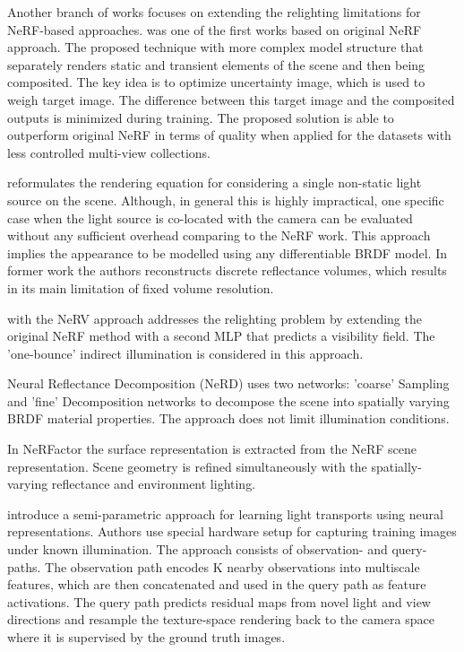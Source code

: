 Another branch of works focuses on extending the relighting limitations for NeRF-based approaches.
\cite{martinbrualla2021nerfw} was one of the first works based on original NeRF approach.
The proposed technique with more complex model structure
that separately renders static and transient elements of the scene
and then being composited.
The key idea is to optimize uncertainty image, which is used to weigh target image.
The difference between this target image and the composited outputs is minimized during training.
The proposed solution is able to outperform original NeRF in terms of quality
when applied for the datasets with less controlled multi-view collections.

\cite{bi2020neural} reformulates the rendering equation for considering a single non-static light source on the scene.
Although, in general this is highly impractical, one specific case
when the light source is co-located with the camera can be evaluated
without any sufficient overhead comparing to the NeRF work.
This approach implies the appearance to be modelled using any differentiable BRDF model.
In former work \cite{bi2020deep} the authors reconstructs discrete reflectance volumes,
which results in its main limitation of fixed volume resolution.

\cite{nerv2021} with the NeRV approach addresses the relighting problem
by extending the original NeRF method with a second MLP
that predicts a visibility field.
The 'one-bounce' indirect illumination is considered in this approach.

Neural Reflectance Decomposition (NeRD) \cite{boss2020nerd} uses two networks:
'coarse' Sampling and 'fine' Decomposition networks to decompose the scene into
spatially varying BRDF material properties.
The approach does not limit illumination conditions.

In NeRFactor \cite{nerfactor} the surface representation is extracted from the NeRF scene representation.
Scene geometry is refined simultaneously with the spatially-varying reflectance and environment lighting.



\cite{Zhang2021lighttransport} introduce a semi-parametric approach
for learning light transports using neural representations.
Authors use special hardware setup for capturing training images under known illumination.
The approach consists of observation- and query-paths.
The observation path encodes K nearby observations into multiscale features,
which are then concatenated and used in the query path as feature activations.
The query path predicts residual maps from novel light and view directions
and resample the texture-space rendering back to the camera space
where it is supervised by the ground truth images.

